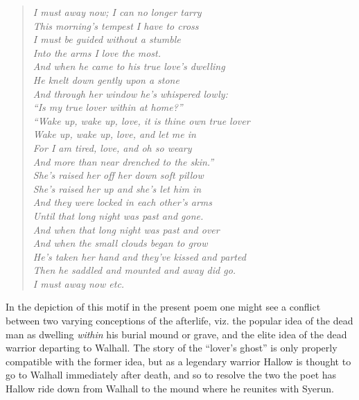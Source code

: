 \begin{quote}\begin{small}\itshape I must away now; I can no longer tarry \\
This morning’s tempest I have to cross \\
I must be guided without a stumble \\
Into the arms I love the most. \\

And when he came to his true love’s dwelling \\
He knelt down gently upon a stone \\
And through her window he’s whispered lowly: \\
“Is my true lover within at home?” \\

“Wake up, wake up, love, it is thine own true lover \\
Wake up, wake up, love, and let me in \\
For I am tired, love, and oh so weary \\
And more than near drenched to the skin.” \\

She’s raised her off her down soft pillow \\
She’s raised her up and she’s let him in \\
And they were locked in each other’s arms \\
Until that long night was past and gone. \\

And when that long night was past and over \\
And when the small clouds began to grow \\
He’s taken her hand and they’ve kissed and parted \\
Then he saddled and mounted and away did go. \\

I must away now \emph{etc.}\end{small}\end{quote}

In the depiction of this motif in the present poem one might see a conflict between two varying conceptions of the afterlife, viz. the popular idea of the dead man as dwelling \emph{within} his burial mound or grave, and the elite idea of the dead warrior departing to Walhall.  The story of the “lover’s ghost” is only properly compatible with the former idea, but as a legendary warrior Hallow is thought to go to Walhall immediately after death, and so to resolve the two the poet has Hallow ride down from Walhall to the mound where he reunites with Syerun.

